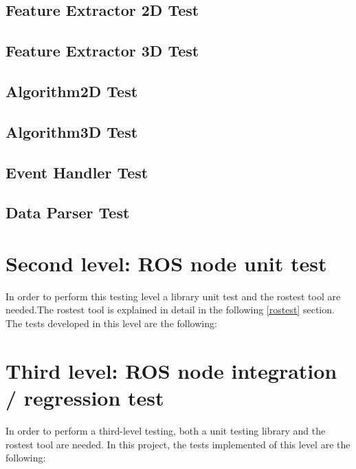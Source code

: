 			\subsection{Feature Extractor 2D Test}

			\subsection{Feature Extractor 3D Test}

			\subsection{Algorithm2D Test}

			\subsection{Algorithm3D Test}

			\subsection{Event Handler Test}

			\subsection{Data Parser Test}

	\section{Second level: ROS node unit test}
		In order to perform this testing level a library unit test and the rostest tool are needed.The rostest tool is explained in detail in the following \ref{rostest} section.\\

		The tests developed in this level are the following: 
			\subsection{}

	\section{Third level: ROS node integration / regression test}
		In order to perform a third-level testing, both a unit testing library and the rostest tool are needed. In this project, the tests implemented of this level are the following: 
			\subsection{}


